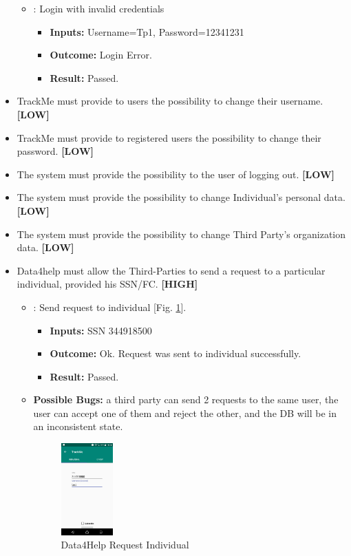 \documentclass[a4paper, hidelinks, 12pt]{report}
\newcommand\requirement[1]{\item[{[REQ-#1]}] }
\newcommand\test[1]{\item[{[TEST-#1]}] }
\begin{document}
\begin{itemize}
\begin{itemize}
			
		\test{6}: Login with invalid credentials
			\begin{itemize}
			\item \textbf{Inputs: } Username=Tp1, Password=12341231
			\item \textbf{Outcome: } Login Error.
			\item \textbf{Result: } Passed. 
			 \end{itemize}	
	\end{itemize}
	
		\requirement{4}TrackMe must provide to users the possibility to change their username. \textbf{[LOW]}
		
		\requirement{5}TrackMe must provide to registered users the possibility to change their password. \textbf{[LOW]}
		\requirement{6}The system must provide the possibility to the user of logging out. \textbf{[LOW]}
		\requirement{7}The system must provide the possibility to change Individual’s personal data. \textbf{[LOW]}
		\requirement{8}The system must provide the possibility to change Third Party’s organization data. \textbf{[LOW]}
		\requirement{9} Data4help must allow the Third-Parties to send a request to a particular individual, provided his SSN/FC.  \textbf{[HIGH]}
		
				\begin{itemize}
		\test{7}: Send request to individual [Fig. \ref{fig:request_individual}].
			\begin{itemize}
			\item \textbf{Inputs: } SSN 344918500			
			\item \textbf{Outcome: } Ok. Request was sent to individual successfully.
			\item \textbf{Result: } Passed. 
			\end{itemize}
			\item{\textbf{Possible Bugs:}} a third party can send 2 requests to the same user, the user can accept one of them and reject the other, and the DB will be in an inconsistent state.
			
		\begin{figure}[H]
					\centering
				\includegraphics[width=0.2\textwidth]{images/request_individual.jpeg}
					\caption[Data4Help Request Individual]{Data4Help Request Individual}
				\label{fig:request_individual}
			\end{figure}
			

\end{itemize}
\end{itemize}
\end{document}
